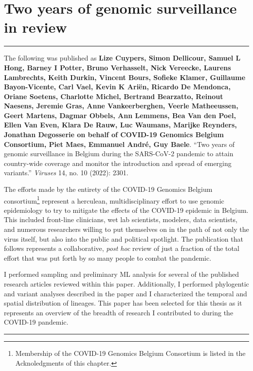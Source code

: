 \section{Two years of genomic surveillance in review}\label{sec:twoYears}

\singlespacing
\hrule
\vspace*{12pt}
The following was published as \textbf{Lize Cuypers, Simon Dellicour, Samuel L Hong, Barney I Potter, Bruno Verhasselt, Nick Vereecke, Laurens Lambrechts, Keith Durkin, Vincent Bours, Sofieke Klamer, Guillaume Bayon-Vicente, Carl Vael, Kevin K Ari\"{e}n, Ricardo De Mendonca, Oriane Soetens, Charlotte Michel, Bertrand Bearzatto, Reinout Naesens, Jeremie Gras, Anne Vankeerberghen, Veerle Matheeussen, Geert Martens, Dagmar Obbels, Ann Lemmens, Bea Van den Poel, Ellen Van Even, Klara De Rauw, Luc Waumans, Marijke Reynders, Jonathan Degosserie on behalf of COVID-19 Genomics Belgium Consortium, Piet Maes, Emmanuel Andr\'{e}, Guy Baele}.
``Two years of genomic surveillance in Belgium during the SARS-CoV-2 pandemic to attain country-wide coverage and monitor the introduction and spread of emerging variants.'' \textit{Viruses} 14, no.
10 (2022): 2301.

The efforts made by the entirety of the COVID-19 Genomics Belgium consortium\footnote{Membership of the COVID-19 Genomics Belgium Consortium is listed in the Acknoledgments of this chapter.} represent a herculean, multidisciplinary effort to use genomic epidemiology to try to mitigate the effects of the COVID-19 epidemic in Belgium.
This included front-line clinicians, wet lab scientists, modelers, data scientists, and numerous researchers willing to put themselves on in the path of not only the virus itself, but also into the public and political spotlight.
The publication that follows represents a collaborative, \textit{post hoc} review of just a fraction of the total effort that was put forth by so many people to combat the pandemic.

I performed sampling and preliminary ML analysis for several of the published research articles reviewed within this paper. Additionally, I performed phylogentic and variant analyses described in the paper and I characterized the temporal and spatial distribution of lineages. This paper has been selected for this thesis as it represents an overview of the breadth of research I contributed to during the COVID-19 pandemic.
\vspace*{12pt}
\hrule
\onehalfspacing

